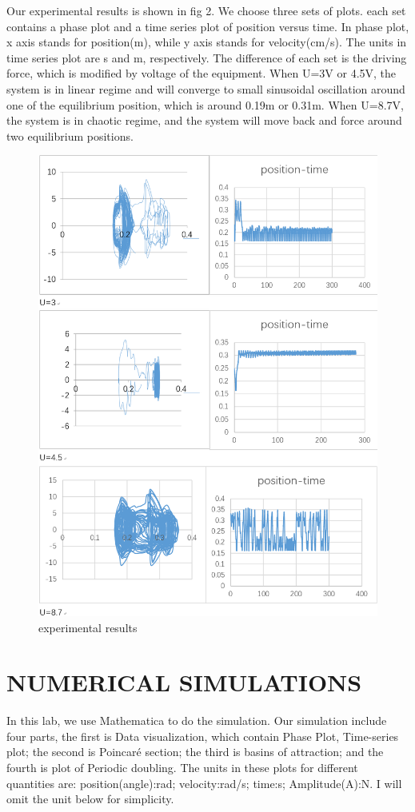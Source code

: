 \documentclass{article}
\begin{document}
Our experimental results is shown in fig 2. We choose three sets of plots. each set contains a phase plot and a time series plot of position versus time. In phase plot, x axis stands for position(m), while y axis stands for velocity(cm/s). The units in time series plot are s and m, respectively.
The difference of each set is the driving force, which is modified by voltage of the equipment. When U=3V or 4.5V, the system is in linear regime and will converge to small sinusoidal oscillation around one of the equilibrium position, which is around 0.19m or 0.31m. When U=8.7V, the system is in chaotic regime, and the system will move back and force around two equilibrium positions. 
\begin{figure}[h]
	\centering
	\includegraphics[width=0.7\linewidth]{plot/exp_res}
	\caption{experimental results}
	\label{fig:expres}
\end{figure}




\section{\textbf{NUMERICAL SIMULATIONS}}

In this lab, we use Mathematica to do the simulation. Our simulation include four parts, the first is Data visualization, which contain Phase Plot, Time-series plot; the second is Poincaré section; the third is basins of attraction; and the fourth is plot of Periodic doubling. The units in these plots for different quantities are: position(angle):rad; velocity:rad/s; time:s; Amplitude(A):N. I will omit the unit below for simplicity.
\end{document}
